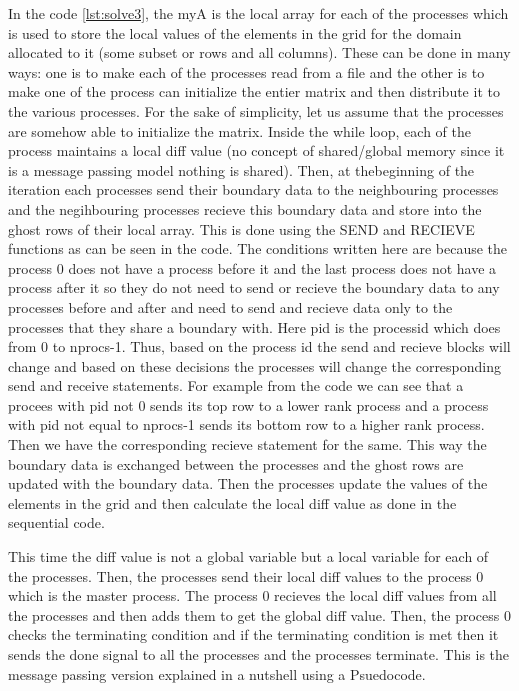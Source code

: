 \documentclass[12pt]{article}
\begin{document}
In the code \ref{lst:solve3}, the myA is the local array for each of the processes which is used to store the local values of the elements in the grid
for the domain allocated to it (some subset or rows and all columns). These can be done in many ways: one is to make each of the processes read from a file
and the other is to make one of the process can initialize the entier matrix and then distribute it to the various processes.
For the sake of simplicity, let us assume that the processes are somehow able to initialize the matrix.
Inside the while loop, each of the process maintains a local diff value (no concept of shared/global memory since it is a message passing model nothing is shared).
Then, at thebeginning of the iteration each processes send their boundary data to the neighbouring processes and the negihbouring processes recieve 
this boundary data and store into the ghost rows of their local array. This is done using the SEND and RECIEVE functions as can be seen in the code.
The conditions written here are because the process 0 does not have a process before it and the last process does not have a process after it so 
they do not need to send or recieve the boundary data to any processes before and after and need to send and recieve data only to the processes that they share a boundary with. 
Here pid is the processid which does from 0 to nprocs-1. Thus, based on the process id the send and recieve blocks will change and 
based on these decisions the processes will change the corresponding send and receive statements. For example from the code we can see that a procees with pid not 0 sends 
its top row to a lower rank process and a process with pid not equal to nprocs-1 sends its bottom row to a higher rank process. Then we have the corresponding recieve statement for
the same. This way the boundary data is exchanged between the processes and the ghost rows are updated with the boundary data.
Then the processes update the values of the elements in the grid and then calculate the local diff value as done in the sequential code.

This time the diff value is not a global variable but a local variable for each of the processes. 
Then, the processes send their local diff values to the process 0 which is the master process. The process 0 recieves the local diff values from all the processes and then adds them to get the global diff value.
Then, the process 0 checks the terminating condition and if the terminating condition is met then it sends the done signal to all the processes and the processes terminate.
This is the message passing version explained in a nutshell using a Psuedocode.
\end{document}
